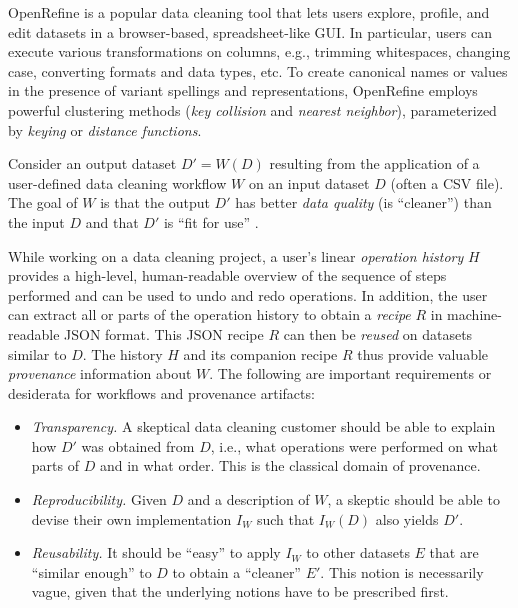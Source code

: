 \documentclass[runningheads]{llncs}
\begin{document}
OpenRefine \cite{OpenRefine} is a popular data cleaning tool that lets users explore, profile, and
edit datasets in a browser-based, spreadsheet-like GUI. In particular, users can execute various
transformations on columns, e.g., trimming whitespaces, changing case, converting formats and data
types, etc. To create canonical names or values in the presence of variant spellings and
representations, OpenRefine employs powerful clustering methods (\emph{key collision} and
\emph{nearest neighbor}), parameterized by \emph{keying} or \emph{distance functions}. 

Consider an output dataset $D' = W(D)$ resulting from the application of a user-defined data
cleaning workflow $W$ on an input dataset $D$ (often a CSV file). The goal of $W$ is that the output
$D'$ has better \emph{data quality} (is ``cleaner'') than the input $D$ and that $D'$ is ``fit for
use'' \cite{wang1996accuracy,sadiq2013handbook}.

While working on a data cleaning project, a user's linear \emph{operation history} $H$ provides a high-level, human-readable overview of the sequence of steps performed and can be used to undo and redo operations. In addition, the user can extract all or parts of the operation history to obtain a \emph{recipe} $R$ in machine-readable JSON format. This JSON recipe $R$ can then be \emph{reused} on datasets similar to $D$. The history $H$ and its companion recipe $R$ thus provide valuable \emph{provenance} information about $W$. The following are important requirements or desiderata for workflows and provenance artifacts: 

\begin{itemize}
\item  \emph{Transparency.} A skeptical data cleaning customer should be able to explain how $D'$ was obtained from $D$, i.e., what operations were performed on what parts of $D$ and in what order. This is the classical domain of provenance.
\item \emph{Reproducibility.} Given $D$ and a description of $W$,  a skeptic should be able to devise their own implementation $I_W$ such that $I_W(D)$ also yields $D'$.
\item 
\emph{Reusability.} It should be ``easy'' to apply $I_W$ to other datasets $E$ that are ``similar
enough'' to $D$ to obtain a ``cleaner'' $E'$. This notion is necessarily vague, given that
the underlying notions have to be prescribed first. 
\end{itemize}
\end{document}

